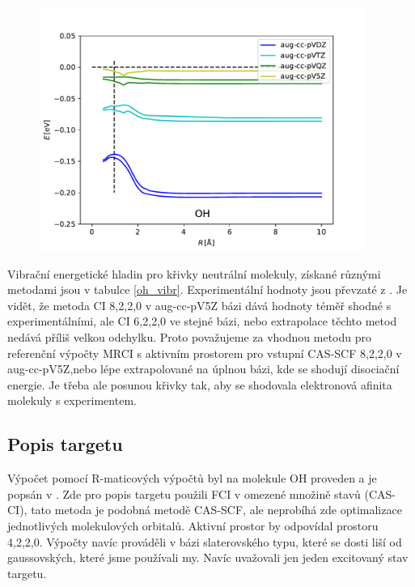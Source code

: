 \begin{figure}
\centering
\includegraphics[width=0.95\textwidth]{../img/OH-lin-dif.pdf}
\caption{\TD}
\label{grOHlindif}
\end{figure}

Vibrační energetické hladin pro křivky neutrální molekuly, získané různými metodami 
jsou v tabulce \ref{oh_vibr}. Experimentální hodnoty jsou převzaté z 
\cite{OH_vibr}. Je vidět, že metoda CI 8,2,2,0 v aug-cc-pV5Z bázi  dává hodnoty téměř 
shodné s experimentálními, ale CI 6,2,2,0 ve stejné bázi, nebo extrapolace těchto metod 
nedává příliš velkou odchylku. 
Proto  považujeme za vhodnou metodu pro referenční výpočty MRCI s aktivním prostorem 
pro vstupní CAS-SCF 8,2,2,0 v aug-cc-pV5Z,nebo lépe extrapolované na úplnou bázi, kde 
se shodují disociační energie. Je třeba ale posunou křivky tak, aby se shodovala 
elektronová afinita molekuly s experimentem.


\subsection{Popis targetu}
Výpočet pomocí R-maticových výpočtů byl na molekule OH proveden a je popsán v 
\cite{OH_Rmatrix}. Zde pro popis targetu použili FCI v omezené množině stavů (CAS-CI), 
tato metoda je podobná metodě CAS-SCF, ale neprobíhá zde optimalizace jednotlivých 
molekulových orbitalů. Aktivní prostor by odpovídal prostoru 4,2,2,0. Výpočty navíc 
prováděli v bázi slaterovského typu, které se dosti liší od gaussovských, které jsme 
používali my. Navíc uvažovali jen jeden excitovaný stav targetu.


